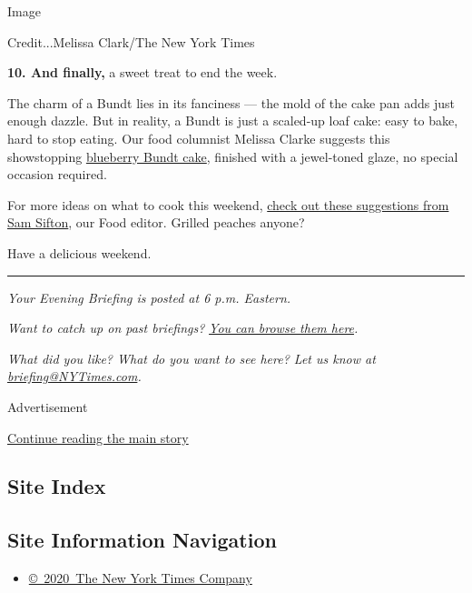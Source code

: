 Image

Credit...Melissa Clark/The New York Times

\textbf{10. And finally,} a sweet treat to end the week.

The charm of a Bundt lies in its fanciness --- the mold of the cake pan
adds just enough dazzle. But in reality, a Bundt is just a scaled-up
loaf cake: easy to bake, hard to stop eating. Our food columnist Melissa
Clarke suggests this showstopping
\href{https://www.nytimes3xbfgragh.onion/2020/08/05/dining/blueberry-bundt-cake.html}{blueberry
Bundt cake}, finished with a jewel-toned glaze, no special occasion
required.

For more ideas on what to cook this weekend,
\href{https://www.nytimes3xbfgragh.onion/2020/08/07/dining/what-to-cook-this-weekend.html}{check
out these suggestions from Sam Sifton}, our Food editor. Grilled peaches
anyone?

Have a delicious weekend.

\begin{center}\rule{0.5\linewidth}{\linethickness}\end{center}

\emph{Your Evening Briefing is posted at 6 p.m. Eastern.}

\emph{Want to catch up on past briefings?}
\href{https://www.nytimes3xbfgragh.onion/series/us-evening-briefing}{\emph{You
can browse them here}}\emph{.}

\emph{What did you like? What do you want to see here? Let us know at}
\href{mailto:briefing@NYTimes.com?subject=Evening\%20Briefing\%20Feedback}{\emph{briefing@NYTimes.com}}\emph{.}

Advertisement

\protect\hyperlink{after-bottom}{Continue reading the main story}

\hypertarget{site-index}{%
\subsection{Site Index}\label{site-index}}

\hypertarget{site-information-navigation}{%
\subsection{Site Information
Navigation}\label{site-information-navigation}}

\begin{itemize}
\tightlist
\item
  \href{https://help.nytimes3xbfgragh.onion/hc/en-us/articles/115014792127-Copyright-notice}{©~2020~The
  New York Times Company}
\end{itemize}

